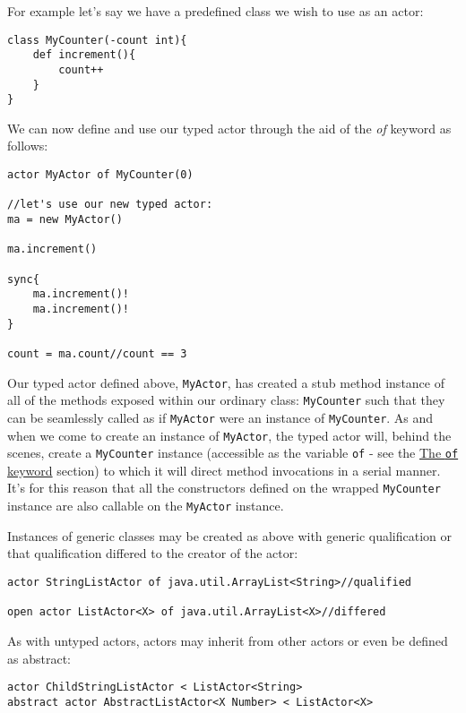 \documentclass[conc-doc]{subfiles}
\begin{document}
For example let's say we have a predefined class we wish to use as an actor:

\begin{lstlisting}
class MyCounter(-count int){
	def increment(){
		count++
	}
}
\end{lstlisting}

We can now define and use our typed actor through the aid of the \textit{of} keyword as follows:

\begin{lstlisting}
actor MyActor of MyCounter(0)

//let's use our new typed actor:
ma = new MyActor()

ma.increment()

sync{
	ma.increment()!
	ma.increment()!
}

count = ma.count//count == 3
\end{lstlisting}

Our typed actor defined above, \lstinline{MyActor}, has created a stub method instance of all of the methods exposed within our ordinary class: \lstinline{MyCounter} such that they can be seamlessly called as if \lstinline{MyActor} were an instance of \lstinline{MyCounter}. As and when we come to create an instance of \lstinline{MyActor}, the typed actor will, behind the scenes, create a \lstinline{MyCounter} instance (accessible as the variable \lstinline{of} - see the \hyperref[subsubsec:ofKeyword]{The \lstinline!of! keyword} section) to which it will direct method invocations in a serial manner. It's for this reason that all the constructors defined on the wrapped \lstinline{MyCounter} instance are also callable on the \lstinline{MyActor} instance.

Instances of generic classes may be created as above with generic qualification or that qualification differed to the creator of the actor:

\begin{lstlisting}
actor StringListActor of java.util.ArrayList<String>//qualified

open actor ListActor<X> of java.util.ArrayList<X>//differed
\end{lstlisting}

As with untyped actors, actors may inherit from other actors or even be defined as abstract:

\begin{lstlisting}
actor ChildStringListActor < ListActor<String>
abstract actor AbstractListActor<X Number> < ListActor<X>
\end{lstlisting}
\end{document}
